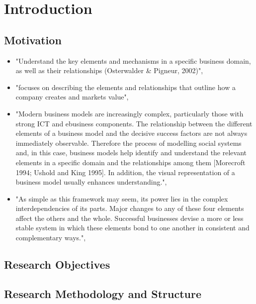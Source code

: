 \chapter{Introduction}\label{ch:intro}

\section{Motivation}

\begin{itemize}
	\item "Understand the key elements and mechanisms in a specific business domain, as well as their relationships (Osterwalder \& Pigneur, 2002)", \citep[p. 303]{Pateli2004}
	\item "focuses on describing the elements and relationships that outline how a company creates and markets value", \citep[p. 7]{Osterwalder2005}
	\item "Modern business models are increasingly complex, particularly those with strong ICT and ebusiness components. The relationship between the different elements of a business model and the decisive success factors are not always immediately observable. Therefore the process of modelling social systems and, in this case, business models help identify and understand the relevant elements in a specific domain and the relationships among them [Morecroft 1994; Ushold and King 1995]. In addition, the visual representation of a business model usually enhances understanding.", \citep[p. 14]{Osterwalder2005}
	\item "As simple as this framework may seem, its power lies in the complex interdependencies of its parts. Major changes to any of these four elements affect the others and the whole. Successful businesses devise a more or less stable system in which these elements bond to one another in consistent and complementary ways.", \citep[p. 53]{Johnson2008}
\end{itemize}


\section{Research Objectives}

\section{Research Methodology and Structure}
